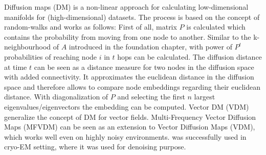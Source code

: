 Diffusion maps\cite{diffusionMaps} (DM) is a non-linear approach for calculating low-dimensional manifolds
for (high-dimensional) datasets. 
The process is based on the concept of random-walks and works as follows:
First of all, matrix $P$ is calculated which contains the probability from moving from one node to another.
Similar to the k-neighbourhood of $A$ introduced in the foundation chapter, with power of $P^t$
probabilities of reaching node $i$ in $t$ hops can be calculated. 
The diffusion distance at time $t$ can be seen as a distance measure for two nodes in the diffusion space
with added connectivity. It approximates the euclidean distance in the diffusion space and therefore 
allows to compare node embeddings regarding their euclidean distance.
With diagonalization of $P$ and selecting the first $n$ largest eigenvalues/eigenvectors the embedding can be computed.
Vector DM (VDM)\cite{vectorDiffusionMaps} generalize the concept of DM for vector fields.
Multi-Frequency Vector Diffusion Maps (MFVDM)\citet{multiDiffusionMaps} 
can be seen as an extension to Vector Diffusion Maps (VDM)\cite{vectorDiffusionMaps}, 
which works well even on highly noisy environments.
\cite{multiDiffusionMaps} was successfully used in cryo-EM setting, where it was used for denoising purpose\cite{cryoEmMutliDM}.
